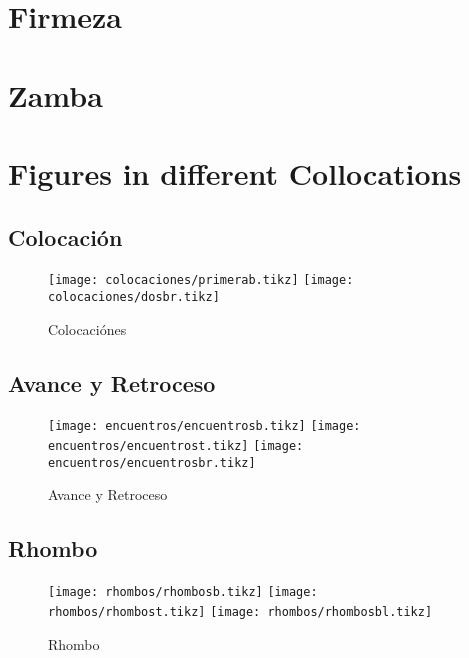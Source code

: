 \FloatBarrier
\section{Firmeza}

\FloatBarrier
\section{Zamba}
\label{sec:zamba}

\FloatBarrier
\section{Figures in different Collocations}
\label{sec:figs_collocations}

\FloatBarrier
\subsection{Colocación}
\label{subsec:collocations}

\begin{figure}[h]
	\texttt{[image: colocaciones/primerab.tikz]}
	\hspace*{\fill}
	\texttt{[image: colocaciones/dosbr.tikz]}
	\caption{Colocaciónes}
	\label{fig:collocations:1}
\end{figure}

\FloatBarrier
\subsection{Avance y Retroceso}
\label{subsec:encuentro}

\begin{figure}[h]
	\texttt{[image: encuentros/encuentrosb.tikz]}
	\hspace*{\fill}
	\texttt{[image: encuentros/encuentrost.tikz]}
	\hspace*{\fill}
	\texttt{[image: encuentros/encuentrosbr.tikz]}
	\caption{Avance y Retroceso}
	\label{fig:encuentro}
\end{figure}

\FloatBarrier

\subsection{Rhombo}
\label{subsec:rhombo}

\begin{figure}[h]
	\texttt{[image: rhombos/rhombosb.tikz]}
	\hspace*{\fill}
	\texttt{[image: rhombos/rhombost.tikz]}
	\hspace*{\fill}
	\texttt{[image: rhombos/rhombosbl.tikz]}
	\caption{Rhombo}
	\label{fig:rhombo}
\end{figure}

